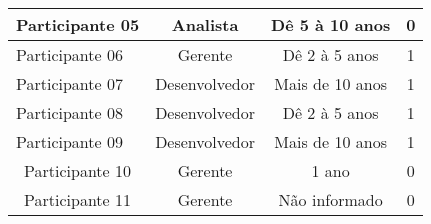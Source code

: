 \begin{table}[htb]
\begin{tabular}{|l|c|c|c|}
Participante 05                                                                       & Analista                                                              & Dê 5 à 10 anos                                                                                    & 0                                                                                                  \\ \hline
Participante 06                                                                       & Gerente                                                               & Dê 2 à 5 anos                                                                                     & 1                                                                                                  \\ \hline
Participante 07                                                                       & Desenvolvedor                                                         & Mais de 10 anos                                                                                   & 1                                                                                                  \\ \hline
Participante 08                                                                       & Desenvolvedor                                                         & Dê 2 à 5 anos                                                                                     & 1                                                                                                  \\ \hline
Participante 09                                                                       & Desenvolvedor                                                         & Mais de 10 anos                                                                                   & 1                                                                                                  \\ \hline
\multicolumn{1}{|c|}{Participante 10}                                                 & Gerente                                                               & 1 ano                                                                                             & 0                                                                                                  \\ \hline
\multicolumn{1}{|c|}{Participante 11}                                                 & Gerente                                                               & Não informado                                                                                     & 0                                                                                                  \\ \hline

\end{tabular}
\end{table}
